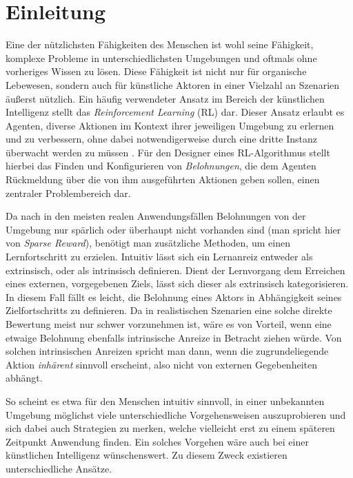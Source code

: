 \section{Einleitung}
\label{sec:intro}
Eine der nützlichsten Fähigkeiten des Menschen ist wohl seine Fähigkeit, komplexe Probleme in unterschiedlichsten Umgebungen und oftmals ohne vorheriges Wissen zu lösen.
Diese Fähigkeit ist nicht nur für organische Lebewesen, sondern auch für künstliche Aktoren in einer Vielzahl an Szenarien äußerst nützlich.
Ein häufig verwendeter Ansatz im Bereich der künstlichen Intelligenz stellt das \textit{Reinforcement Learning} (RL) dar. Dieser Ansatz erlaubt es Agenten, diverse Aktionen im Kontext ihrer jeweiligen Umgebung zu erlernen und zu verbessern, ohne dabei notwendigerweise durch eine dritte Instanz überwacht werden zu müssen \cite{reinforcement_learning_kaelbling}. 
Für den Designer eines RL-Algorithmus stellt hierbei das Finden und Konfigurieren von \textit{Belohnungen}, die dem Agenten Rückmeldung über die von ihm ausgeführten Aktionen geben sollen, einen zentraler Problembereich dar.

Da nach \cite{reachability_savinov} in den meisten realen Anwendungsfällen Belohnungen von der Umgebung nur spärlich oder überhaupt nicht vorhanden sind (man spricht hier von \textit{Sparse Reward}), benötigt man zusätzliche Methoden, um einen Lernfortschritt zu erzielen.
Intuitiv lässt sich ein Lernanreiz entweder als extrinsisch, oder als intrinsisch definieren. Dient der Lernvorgang dem Erreichen eines externen, vorgegebenen Ziels, lässt sich dieser als extrinsisch kategorisieren. In diesem Fall fällt es leicht, die Belohnung eines Aktors in Abhängigkeit seines Zielfortschritts zu definieren. 
Da in realistischen Szenarien eine solche direkte Bewertung meist nur schwer vorzunehmen ist, wäre es von Vorteil, wenn eine etwaige Belohnung ebenfalls intrinsische Anreize in Betracht ziehen würde. Von solchen intrinsischen Anreizen spricht man dann, wenn die zugrundeliegende Aktion \textit{inhärent} sinnvoll erscheint, also nicht von  externen Gegebenheiten abhängt.

So scheint es etwa für den Menschen intuitiv sinnvoll, in einer unbekannten Umgebung möglichst viele unterschiedliche Vorgehensweisen auszuprobieren und sich dabei auch Strategien zu merken, welche vielleicht erst zu einem späteren Zeitpunkt Anwendung finden. Ein solches Vorgehen wäre auch bei einer künstlichen Intelligenz wünschenswert. Zu diesem Zweck existieren unterschiedliche Ansätze.

